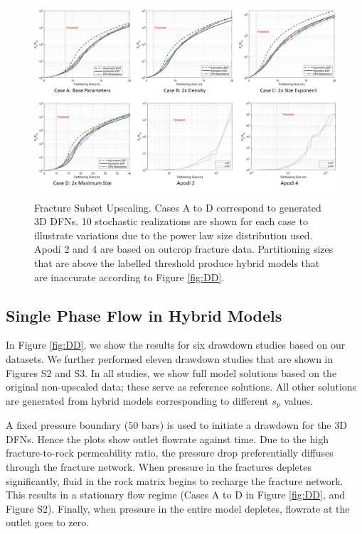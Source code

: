 \documentclass[draft]{agujournal2018}
\begin{document}
\begin{figure}[h]
 \centering

 \includegraphics[width=\textwidth]{FSU_main.jpg}

 \caption{Fracture Subset Upscaling. Cases A to D correspond to generated 3D DFNs. 10 stochastic realizations are shown for each case to illustrate variations due to the power law size distribution used. Apodi 2 and 4 are based on outcrop fracture data. Partitioning sizes that are above the labelled threshold produce hybrid models that are inaccurate according to Figure \ref{fig:DD}.}
 \label{fig:FSU}
\end{figure}

\subsection{Single Phase Flow in Hybrid Models}
In Figure \ref{fig:DD}, we show the results for six drawdown studies based on our datasets. We further performed eleven drawdown studies that are shown in Figures S2 and S3. In all studies, we show full model solutions based on the original non-upscaled data; these serve as reference solutions. All other solutions are generated from hybrid models corresponding to different $s_p$ values. 

A fixed pressure boundary ($50$ bars) is used to initiate a drawdown for the 3D DFNs. Hence the plots show outlet flowrate against time. Due to the high fracture-to-rock permeability ratio, the pressure drop preferentially diffuses through the fracture network. When pressure in the fractures depletes significantly, fluid in the rock matrix begins to recharge the fracture network. This results in a stationary flow regime (Cases A to D in Figure \ref{fig:DD}, and Figure S2). Finally, when pressure in the entire model depletes, flowrate at the outlet goes to zero.
\end{document}
